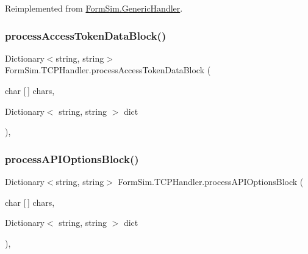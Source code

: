 Reimplemented from \mbox{\hyperlink{class_form_sim_1_1_generic_handler_a824697e5c22a4f1cf8ce4e512b6954ad}{Form\+Sim.\+Generic\+Handler}}.

\mbox{\label{class_form_sim_1_1_t_c_p_handler_aedf978802bf4fee2c7b7529935da5bf3}} 
\subsubsection{\texorpdfstring{process\+Access\+Token\+Data\+Block()}{processAccessTokenDataBlock()}}
{\footnotesize\ttfamily Dictionary$<$string, string$>$ Form\+Sim.\+T\+C\+P\+Handler.\+process\+Access\+Token\+Data\+Block (\begin{DoxyParamCaption}\item[{char \mbox{[}$\,$\mbox{]}}]{chars,  }\item[{Dictionary$<$ string, string $>$}]{dict }\end{DoxyParamCaption})\hspace{0.3cm}{\ttfamily [inline]}, {\ttfamily [private]}}

\mbox{\label{class_form_sim_1_1_t_c_p_handler_a404ed1a6ccc26078fa89887505807598}} 
\subsubsection{\texorpdfstring{process\+A\+P\+I\+Options\+Block()}{processAPIOptionsBlock()}}
{\footnotesize\ttfamily Dictionary$<$string, string$>$ Form\+Sim.\+T\+C\+P\+Handler.\+process\+A\+P\+I\+Options\+Block (\begin{DoxyParamCaption}\item[{char \mbox{[}$\,$\mbox{]}}]{chars,  }\item[{Dictionary$<$ string, string $>$}]{dict }\end{DoxyParamCaption})\hspace{0.3cm}{\ttfamily [inline]}, {\ttfamily [private]}}

